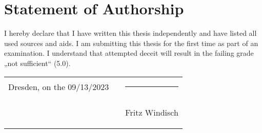 

\chapter*{Statement of Authorship}

I hereby declare that I have written this thesis independently and have listed all used
sources and aids. I am submitting this thesis for the first time as part of an examination. I
understand that attempted deceit will result in the failing grade „not sufficient“ (5.0).\\[4ex]

\renewcommand{\arraystretch}{0}
\begin{table}[h]
    \begin{tabularx}{\textwidth}{ llX }
        Dresden, on the 09/13/2023 & \hspace{40pt} & \hrule                                             \\
        &               & \begin{flushright}
                              Fritz Windisch
        \end{flushright} \\
    \end{tabularx}
\end{table}
\renewcommand{\arraystretch}{1}